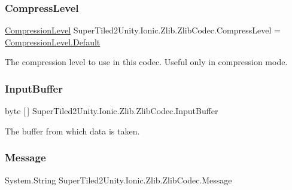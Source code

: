 \subsubsection{\texorpdfstring{Compress\+Level}{CompressLevel}}
{\footnotesize\ttfamily \mbox{\hyperlink{namespace_super_tiled2_unity_1_1_ionic_1_1_zlib_a20f6771804996c363f454ad9765cd7db}{Compression\+Level}} Super\+Tiled2\+Unity.\+Ionic.\+Zlib.\+Zlib\+Codec.\+Compress\+Level = \mbox{\hyperlink{namespace_super_tiled2_unity_1_1_ionic_1_1_zlib_a20f6771804996c363f454ad9765cd7dba7a1920d61156abc05a60135aefe8bc67}{Compression\+Level.\+Default}}}



The compression level to use in this codec. Useful only in compression mode. 

\mbox{\label{class_super_tiled2_unity_1_1_ionic_1_1_zlib_1_1_zlib_codec_a402b3630c322f33762b0a5ac1e176eef}} 
\subsubsection{\texorpdfstring{Input\+Buffer}{InputBuffer}}
{\footnotesize\ttfamily byte \mbox{[}$\,$\mbox{]} Super\+Tiled2\+Unity.\+Ionic.\+Zlib.\+Zlib\+Codec.\+Input\+Buffer}



The buffer from which data is taken. 

\mbox{\label{class_super_tiled2_unity_1_1_ionic_1_1_zlib_1_1_zlib_codec_af3f680d470f3792d3918273bc48dc4d7}} 
\subsubsection{\texorpdfstring{Message}{Message}}
{\footnotesize\ttfamily System.\+String Super\+Tiled2\+Unity.\+Ionic.\+Zlib.\+Zlib\+Codec.\+Message}



